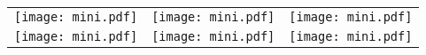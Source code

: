 \centering
\begin{tabular}{ccc}
    \texttt{[image: mini.pdf]} &
    \texttt{[image: mini.pdf]} &
    \texttt{[image: mini.pdf]} \\
    \texttt{[image: mini.pdf]} &
    \texttt{[image: mini.pdf]} \rule{0pt}{80pt} &
    \texttt{[image: mini.pdf]} \\
\end{tabular}
